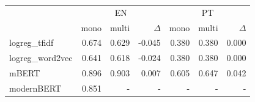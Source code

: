 \begin{tabular}{lrrrrrr}
\toprule
 & \multicolumn{3}{c}{EN} & \multicolumn{3}{c}{PT} \\
 & mono & multi & $\Delta$ & mono & multi & $\Delta$ \\
\midrule
logreg\_tfidf & 0.674 & 0.629 & -0.045 & 0.380 & 0.380 & 0.000 \\
logreg\_word2vec & 0.641 & 0.618 & -0.024 & 0.380 & 0.380 & 0.000 \\
mBERT & 0.896 & 0.903 & 0.007 & 0.605 & 0.647 & 0.042 \\
modernBERT & 0.851 & - & - & - & - & - \\
\bottomrule
\end{tabular}
